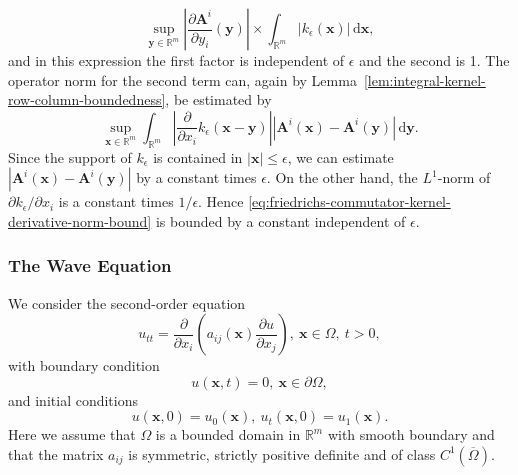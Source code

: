 \begin{Proof}
\begin{equation}\label{eq:friedrichs-commutator-coefficient-derivative-norm-bound}
\sup_{\bm{y}\in\mathbb{R}^m}\left|\dfrac{\partial\bm{A}^i}{\partial y_i}(\bm{y})\right|\times\int_{\mathbb{R}^m}|k_\epsilon(\bm{x})|\,\mathrm{d}\bm{x},
\end{equation}
and in this expression the first factor is independent of $\epsilon$ and the second is 1. The operator norm for the second term can, again by Lemma~\ref{lem:integral-kernel-row-column-boundedness}, be estimated by
\begin{equation}\label{eq:friedrichs-commutator-kernel-derivative-norm-bound}
\sup_{\bm{x}\in\mathbb{R}^m}\int_{\mathbb{R}^m}\left|\dfrac{\partial}{\partial x_i}k_\epsilon(\bm{x}-\bm{y})\right|\left|\bm{A}^i(\bm{x})-\bm{A}^i(\bm{y})\right|\,\mathrm{d}\bm{y}.
\end{equation}
Since the support of $k_\epsilon$ is contained in $|\bm{x}|\leq\epsilon$, we can estimate $|\bm{A}^i(\bm{x})-\bm{A}^i(\bm{y})|$ by a constant times $\epsilon$. On the other hand, the $L^1$-norm of $\partial k_\epsilon/\partial x_i$ is a constant times $1/\epsilon$. Hence \eqref{eq:friedrichs-commutator-kernel-derivative-norm-bound} is bounded by a constant independent of $\epsilon$.
\end{Proof}

\subsubsection{The Wave Equation}\label{subsec:semigroup-wave-equation}

We consider the second-order equation
\begin{equation}\label{eq:semigroup-wave-variable-coefficient-equation}
u_{tt}=\dfrac{\partial}{\partial x_i}\left(a_{ij}(\bm{x})\dfrac{\partial u}{\partial x_j}\right),\ \bm{x}\in\Omega,\ t>0,
\end{equation}
with boundary condition
\begin{equation}\label{eq:semigroup-wave-dirichlet-boundary}
u(\bm{x},t)=0,\ \bm{x}\in\partial\Omega,
\end{equation}
and initial conditions
\begin{equation}\label{eq:semigroup-wave-displacement-velocity-initial-data}
u(\bm{x},0)=u_0(\bm{x}),\ u_t(\bm{x},0)=u_1(\bm{x}).
\end{equation}
Here we assume that $\Omega$ is a bounded domain in $\mathbb{R}^m$ with smooth boundary and that the matrix $a_{ij}$ is symmetric, strictly positive definite and of class $C^1(\overline\Omega)$.

